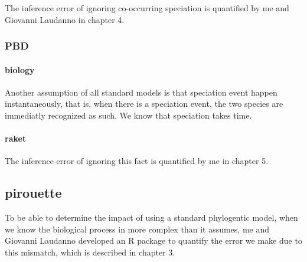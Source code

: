 The inference error of ignoring co-occurring speciation is quantified by
me and Giovanni Laudanno in chapter 4.

\subsubsection{PBD}

\paragraph{biology}

Another assumption of all standard models is that speciation event happen
instantaneously, that is, when there is a speciation event, the two species
are immediatly recognized as such. We know that speciation takes
time. 


\paragraph{raket}

The inference error of ignoring this fact is quantified by
me in chapter 5.


\subsection{pirouette}

To be able to determine the impact of using a standard phylogentic
model, when we know the biological process in more complex than it
assumes, me and Giovanni Laudanno developed an R package 
to quantify the error we make due to this mismatch, which is described
in chapter 3.

